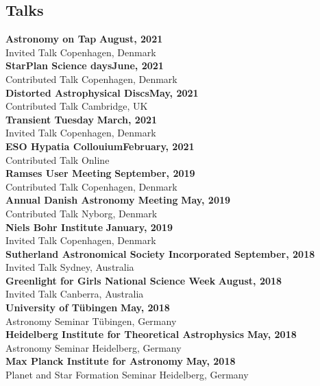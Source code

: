 \documentclass[margin,line]{res}
\begin{document}
\begin{resume}
		\section{\sc Talks}
		{\bf Astronomy on Tap} \hfill {\bf August, 2021}\\
		Invited Talk \hfill Copenhagen, Denmark\\
		{\bf StarPlan Science days}\hfill {\bf June, 2021}\\
		Contributed Talk \hfill Copenhagen, Denmark\\
		{\bf Distorted Astrophysical Discs}\hfill {\bf May, 2021}\\
		Contributed Talk \hfill Cambridge, UK\\
		{\bf Transient Tuesday} \hfill {\bf March, 2021}\\
		Invited Talk \hfill Copenhagen, Denmark\\
		{\bf ESO Hypatia Collouium}\hfill {\bf February, 2021}\\
		Contributed Talk \hfill Online\\
		{\bf Ramses User Meeting} \hfill {\bf September, 2019}\\
		Contributed Talk \hfill Copenhagen, Denmark\\
		{\bf Annual Danish Astronomy Meeting} \hfill {\bf May, 2019}\\
		Contributed Talk \hfill Nyborg, Denmark\\
		{\bf Niels Bohr Institute} \hfill {\bf January, 2019}\\
		Invited Talk \hfill Copenhagen, Denmark\\
		{\bf Sutherland Astronomical Society Incorporated} \hfill {\bf September, 2018}\\
		Invited Talk \hfill Sydney, Australia\\
		{\bf Greenlight for Girls National Science Week} \hfill {\bf August, 2018}\\
		Invited Talk \hfill Canberra, Australia\\
		{\bf University of T\"ubingen} \hfill {\bf May, 2018}\\
		Astronomy Seminar \hfill T\"ubingen, Germany\\
		{\bf Heidelberg Institute for Theoretical Astrophysics} \hfill {\bf May, 2018}\\
		Astronomy Seminar \hfill Heidelberg, Germany\\
		{\bf Max Planck Institute for Astronomy} \hfill {\bf May, 2018}\\
		Planet and Star Formation Seminar \hfill Heidelberg, Germany\\

\end{resume}
\end{document}

